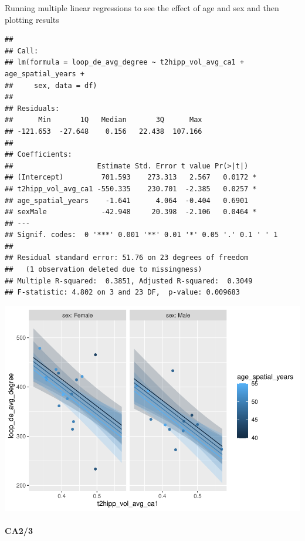 \documentclass[
]{article}
\begin{document}
\vspace{1cm}

Running multiple linear regressions to see the effect of age and sex and
then plotting results

\begin{verbatim}
## 
## Call:
## lm(formula = loop_de_avg_degree ~ t2hipp_vol_avg_ca1 + age_spatial_years + 
##     sex, data = df)
## 
## Residuals:
##      Min       1Q   Median       3Q      Max 
## -121.653  -27.648    0.156   22.438  107.166 
## 
## Coefficients:
##                    Estimate Std. Error t value Pr(>|t|)  
## (Intercept)         701.593    273.313   2.567   0.0172 *
## t2hipp_vol_avg_ca1 -550.335    230.701  -2.385   0.0257 *
## age_spatial_years    -1.641      4.064  -0.404   0.6901  
## sexMale             -42.948     20.398  -2.106   0.0464 *
## ---
## Signif. codes:  0 '***' 0.001 '**' 0.01 '*' 0.05 '.' 0.1 ' ' 1
## 
## Residual standard error: 51.76 on 23 degrees of freedom
##   (1 observation deleted due to missingness)
## Multiple R-squared:  0.3851, Adjusted R-squared:  0.3049 
## F-statistic: 4.802 on 3 and 23 DF,  p-value: 0.009683
\end{verbatim}

\includegraphics{hippocampal_subfield_files/figure-latex/Avg CA1 + AVG Degrees Traveled MLR-1.pdf}
\vspace{1cm}

\paragraph{CA2/3}

~ \vspace{1cm}
\end{document}
